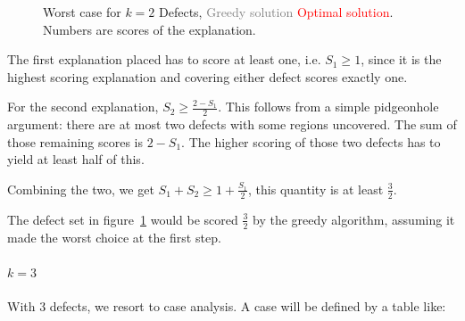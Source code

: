 \documentclass[11pt,twocolumn]{article}
\begin{document}
\begin{figure}[ht!]
\caption{Worst case for $k=2$ Defects, \textcolor{gray}{Greedy solution} \textcolor{red}{Optimal solution}.  Numbers are scores of the explanation.}
\label{fig:k2}
\end{figure}

The first explanation placed has to score at least one, i.e. $S_1 \geq 1$, since it is the highest scoring explanation and covering either defect scores exactly one.  

For the second explanation, $S_2 \geq \frac{2 - S_1}{2}$.  This follows from a simple pidgeonhole argument: there are at most two defects with some regions uncovered.  The sum of those remaining scores is $2 - S_1$.  The higher scoring of those two defects has to yield at least half of this.  

Combining the two, we get $S_1 + S_2 \geq 1 + \frac{S_1}{2}$, this quantity is at least $\frac32$. 

The defect set in figure~\ref{fig:k2} would be scored $\frac32$ by the greedy algorithm, assuming it made the worst choice at the first step.

\paragraph{\textbf{$k=3$}} 

With 3 defects, we resort to case analysis.  A case will be defined by a table like:
\end{document}
